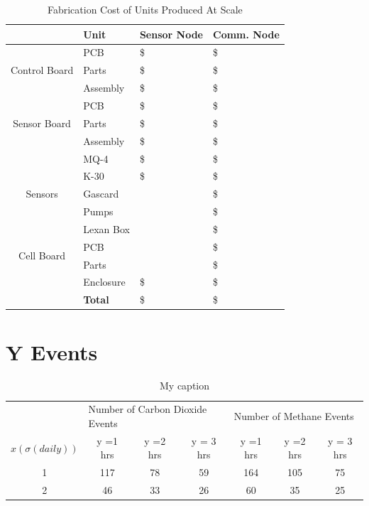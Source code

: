 \documentclass[journal]{IEEEtran}
\begin{document}
		\begin{table}[!t]
			\centering
			\caption{Fabrication Cost of Units Produced At Scale}
			\label{tab:sclcosts}
			\begin{tabular}{cl|l|l}
				& Unit           & Sensor Node    & Comm. Node       \\ \hline 
				\multirow{3}{*}{Control Board} 
				& PCB            & \$\costsclcpcb  & \$\costsclcpcb    \\
				& Parts          & \$\costsclcparts  & \$\costsclcpartc    \\
				& Assembly       & \$\costsclcasyms  & \$\costsclcasymc    \\ \hline
				\multirow{3}{*}{Sensor Board}  
				& PCB            & \$\costsclspcb  & \$\costsclspcb    \\
				& Parts          & \$\costsclsparts  & \$\costsclsparts    \\ 
				& Assembly       & \$\costsclsasym   & \$\costsclsasym     \\ \hline
				\multirow{5}{*}{Sensors}       
				& MQ-4           & \$\costsclMQ   & \$\costsclMQ     \\
				& K-30           & \$\costsclK    & \$\costsclK      \\
				& Gascard        &                & \$\costoneGC     \\
				& Pumps          &                & \$\costonepump   \\
				& Lexan Box      &                & \$\costonelex    \\ \hline
				\multirow{2}{*}{Cell Board}    
				& PCB            &                & \$\costsclcellpcb    \\
				& Parts          &                & \$\costsclcellpart  \\ \hline
				& Enclosure      & \$\costscltycsm& \$\costscltyclg  \\ \cline{2-4} 
				& \textbf{Total} & \$\costsumthr  & \$\costsumfou   
			\end{tabular}
		\end{table}
	
	\section{Y Events}
	\begin{table}[]
		\centering
		\caption{My caption}
		\label{tab:eventcount}
		\begin{tabular}{c|c|c|c|c|c|c}
			& \multicolumn{3}{l|}{Number of Carbon Dioxide Events} & \multicolumn{3}{l|}{Number of Methane Events} \\ \cline{2-7} 
			$x\left(\sigma\left(daily\right)\right)$ & y =1 hrs        & y =2 hrs        & y = 3 hrs        & y =1 hrs      & y =2 hrs      & y = 3 hrs     \\ \hline
			1           & 117             & 78              & 59               & 164           & 105           & 75            \\
			2           & 46              & {\color{red}33}              & 26               & 60            & {\color{red}35}            & 25           
		\end{tabular}
	\end{table}
	
\end{document}
